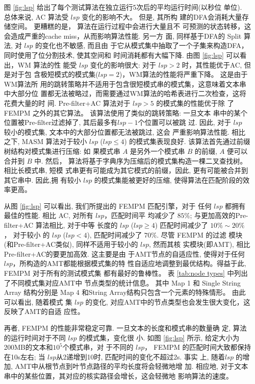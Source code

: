 图 \ref{fig:lsp} 给出了每个测试算法在独立运行5次后的平均运行时间(以秒位
单位). 总体来说, \textsf{AC} 算法受 $lsp$ 变化的影响不大。 但是, 其所构
建的DFA会消耗大量存储空间。 更糟糕的是， 算法在运行过程中会进行大量且不
可预测的状态转移，这会造成严重的cache miss，从而影响算法性能. 另一方
面, 同样基于DFA的 \textsf{Split} 算法, 对 $lsp$ 的变化也不敏感, 而且由
于它从模式集中抽取了一个子集来构造DFA，同时使用了位分割技术, 使其空间和
时间消耗都有大幅下降. 由图 \ref{fig:lsp} 可以看出，\textsf{WM} 算法的性
能受 $lsp$ 变化的影响很大: 对于 $lsp > 2$ 时，其性能优于AC, 但是对于包
含极短模式的模式集($lsp=2$)，WM算法的性能将严重下降。 这是由于WM算法所
用的跳转策略并不适用于包含很短模式串的模式集，这意味着文本串中大部分位
置都无法被略过，而需要通过WM算法的哈希表进行二次检查，这将花费大量的时
间.  \textsf{Pre-filter+AC} 算法对于 $lsp > 5$ 的模式集的性能优于除
了 \textsf{FEMPM} 之外的其它算法。 该算法使用了类似的跳转策略: 一旦文本
串中的某个位置被Pre-filter过滤掉了, 其后最多有$lsp-1$个位置可以被跳
过. 因此, 对于 $lsp$ 较小的模式集, 文本中的大部分位置都无法被跳过, 这会
严重影响算法性能. 相比之下, \textsf{MASM} 算法对于较小 $lsp$ ($lsp
\leq 4$) 的模式集表现良好. 该算法首先通过前缀树结构对模式集进行压缩: 如
果模式串 $A$ 是另外一个模式串 $B$ 的前缀, $A$ 便可以合并到 $B$ 中. 然后，
算法将基于字典序为压缩后的模式集构造一棵二叉查找树。 相比长模式串, 短模
式串更有可能成为其它模式的前缀，因此, 更有可能被合并到其它串中. 因此,拥
有较小 $lsp$ 的模式集能被更好的压缩, 使得算法在匹配阶段的效率更高。

从图 \ref{fig:lsp} 可以看出, 我们所提出的 \textsf{FEMPM} 匹配引擎，对于
任何 $lsp$ 都拥有最佳的性能. 相比 \textsf{AC}, 对所有 $lsp$，匹配时间平
均减少了 $85\%$; 与更加高效的\textsf{Pre-filter+AC} 算法相比, 对于中等
长度的 $lsp$ ($lsp \geq 4$) 匹配时间减少了 $10\% \sim 20\%$， 对于较小
的 $lsp$ ($lsp < 4$), 匹配时间减少了 $70\%$. 尽管 \textsf{FEMPM} 的过滤
模块(和\textsf{Pre-filter+AC}类似), 同样不适用于较小的 $lsp$, 然而其核
实模块(即AMT), 相比 \textsf{Pre-filter+AC}的要更加高效. 这主要是由
于AMT节点的自适应性, 使得对于任何 $lsp$，所构造的AMT都能根据模式集的特
性自适应地调整到最优结构。得益于此, \textsf{FEMPM} 对于所有的测试模式集
都有最好的鲁棒性。 表 \ref{tab:node types} 中列出了不同模式集对应AMT中
节点类型的统计信息。 其中 Map 1 和 Single String Array 结构分别是 Map
4 和String Array结构只包含一个元素的特殊情形。 由此可以看出, 随着模式
集 $lsp$ 的变化, 对应AMT中的节点类型也会发生很大变化，这反映了AMT的自适
应性。

再者, \textsf{FEMPM} 的性能非常稳定可靠. 一旦文本的长度和模式串的数量确
定, 算法的运行时间对于不同 $lsp$ 的模式集，变化很
小. 如图 \ref{fig:lsp} 所示, 给定大小为200MB的文本和$10^5$个模式串，对
于不同的 $lsp$， \textsf{FEMPM} 的匹配时间大致都保持
在10s左右; 当 $lsp$从2递增到10时, 匹配时间的变化不超过2s. 事实
上, 随着$lsp$ 的增加, AMT中从根节点到叶节点路径的平均长度将会轻微地增
加. 相应地, 对于文本串中的某些位置，其对应的核实路径会增长，这会轻微地
影响算法的速度。

